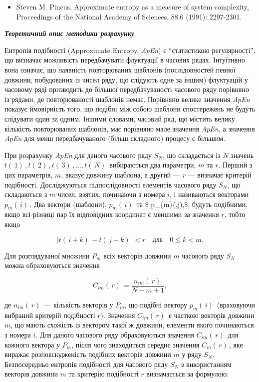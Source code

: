 \documentclass[
  letterpaper,
]{report}
\providecommand{\tightlist}{%
  \setlength{\itemsep}{0pt}\setlength{\parskip}{0pt}}\usepackage{longtable,booktabs,array}
\begin{document}
\begin{itemize}
\tightlist
\item
  Steven M. Pincus, Approximate entropy as a measure of system
  complexity, Proceedings of the National Academy of Sciences, 88.6
  (1991): 2297-2301.
\end{itemize}

\textbf{\emph{Теоретичний опис методики розрахунку}}

Ентропія подібності (Approximate Entropy, \emph{ApEn}) є ``статистикою
регулярності'', що визначає можливість передбачувати флуктуації в
часових рядах. Інтуїтивно вона означає, що наявність повторюваних
шаблонів (послідовностей певної довжини, побудованих із чисел ряду, що
слідують одне за іншим) флуктуацій у часовому ряді призводить до більшої
передбачуваності часового ряду порівняно із рядами, де повторюваності
шаблонів немає. Порівняно велике значення \emph{ApEn} показує
ймовірність того, що подібні між собою шаблони спостережень не будуть
слідувати один за одним. Іншими словами, часовий ряд, що містить велику
кількість повторюваних шаблонів, має порівняно мале значення
\emph{ApEn}, а значення \emph{ApEn} для менш передбачуваного (більш
складного) процесу є більшим.

При розрахунку \emph{ApEn} для даного часового ряду \(S_{N}\), що
складається із \(N\) значень
\(t(\,1)\,, t(\,2)\,, t(\,3)\,, ... , t(\,N)\,\) вибираються два
параметри, \(m\) та \(r\). Перший з цих параметрів, \(m\), вказує
довжину шаблона, а другий --- \(r\) --- визначає критерій подібності.
Досліджуються підпослідовності елементів часового ряду \(S_{N}\), що
складаються з \(m\) чисел, взятих, починаючи з номера \(i\), і
називаються векторами \(p_{m} (\,i)\,\). Два вектори (шаблони),
\(p_{m}(\,i)\,\) та \$ p\_\{m\}(,j),\$, будуть подібними, якщо всі
різниці пар їх відповідних координат є меншими за значення \(r\), тобто
якщо

\[ 
| t(\,i+k)\, - t(\,j+k)\, | < r \quad \textrm{для} \quad 0 \leq k < m. 
\]

Для розглядуваної множини \(P_{m}\) всіх векторів довжини \(m\) часового
ряду \(S_{N}\) можна обраховуються значення

\[ 
C_{im}(\,r)\, = \frac{n_{im}(\,r)\,}{N-m+1}, 
\]

де \(n_{im}(\,r)\,\) --- кількість векторів у \(P_{m}\), що подібні
вектору \(p_{m}(\,i)\,\) (враховуючи вибраний критерій подібності
\(r\)). Значення \(C_{im}(\,r)\,\) є часткою векторів довжини \(m\), що
мають схожість із вектором такої ж довжини, елементи якого починаються з
номера \(i\). Для даного часового ряду обраховуються значення
\(C_{im}(\,r)\,\) для кожного вектора у \(P_{m}\), після чого
знаходиться середнє значення \(C_{m}(\,r)\,\), яке виражає
розповсюдженість подібних векторів довжини \(m\) у ряду \(S_{N}\).
Безпосередньо ентропія подібності для часового ряду \(S_{N}\) з
використанням векторів довжини \(m\) та критерію подібності \(r\)
визначається за формулою:
\end{document}
